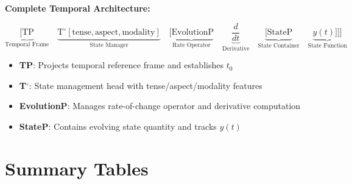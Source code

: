 \documentclass[11pt]{article}
\theoremstyle{defstyle}
\theoremstyle{mapstyle}
\newenvironment{theorembox}
{\begin{tcolorbox}[
  enhanced,
  enforce breakable,
  colback=defbox,
  colframe=theoremgreen!60,
  boxrule=1pt,
  arc=4pt,
  left=8pt,right=8pt,top=8pt,bottom=8pt,
  before skip=10pt,after skip=10pt
]}
{\end{tcolorbox}}
\begin{document}
\begin{theorembox}
\textbf{Complete Temporal Architecture:}

\[
\underbrace{[\text{TP}}_{\text{Temporal Frame}} 
\quad 
\underbrace{\text{T}^\circ[\text{tense}, \text{aspect}, \text{modality}]}_{\text{State Manager}}
\quad 
\underbrace{[\text{EvolutionP}}_{\text{Rate Operator}}
\quad 
\underbrace{\frac{d}{dt}}_{\text{Derivative}}
\quad 
\underbrace{[\text{StateP}}_{\text{State Container}}
\quad 
\underbrace{y(t) ]]]}_{\text{State Function}}
\]

\begin{itemize}
\item \textbf{TP}: Projects temporal reference frame and establishes $t_0$
\item \textbf{T$^\circ$}: State management head with tense/aspect/modality features
\item \textbf{EvolutionP}: Manages rate-of-change operator and derivative computation
\item \textbf{StateP}: Contains evolving state quantity and tracks $y(t)$
\end{itemize}
\end{theorembox}

\vspace{2\baselineskip}

\section{Summary Tables}
\end{document}
